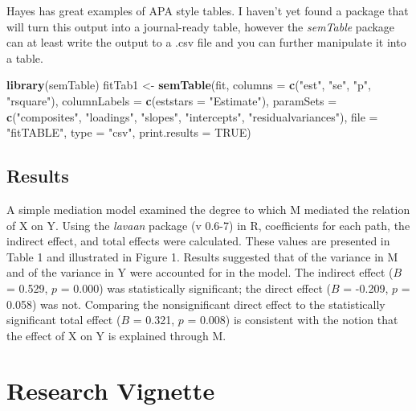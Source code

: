 \documentclass[
  11pt,
]{book}
\newenvironment{Shaded}{\begin{snugshade}}{\end{snugshade}}
\newcommand{\AttributeTok}[1]{\textcolor[rgb]{0.27,0.27,0.27}{#1}}
\newcommand{\ConstantTok}[1]{\textcolor[rgb]{0.37,0.37,0.37}{#1}}
\newcommand{\FunctionTok}[1]{\textcolor[rgb]{0.27,0.27,0.27}{\textbf{#1}}}
\newcommand{\NormalTok}[1]{#1}
\newcommand{\OtherTok}[1]{\textcolor[rgb]{0.37,0.37,0.37}{#1}}
\newcommand{\StringTok}[1]{\textcolor[rgb]{0.5,0.5,0.5}{#1}}
\begin{document}
Hayes has great examples of APA style tables. I haven't yet found a package that will turn this output into a journal-ready table, however the \emph{semTable} package can at least write the output to a .csv file and you can further manipulate it into a table.

\begin{Shaded}
\begin{Highlighting}[]
\FunctionTok{library}\NormalTok{(semTable)}
\NormalTok{fitTab1 }\OtherTok{\textless{}{-}} \FunctionTok{semTable}\NormalTok{(fit, }\AttributeTok{columns =} \FunctionTok{c}\NormalTok{(}\StringTok{"est"}\NormalTok{, }\StringTok{"se"}\NormalTok{, }\StringTok{"p"}\NormalTok{, }\StringTok{"rsquare"}\NormalTok{),  }\AttributeTok{columnLabels =} \FunctionTok{c}\NormalTok{(}\AttributeTok{eststars =} \StringTok{"Estimate"}\NormalTok{), }\AttributeTok{paramSets =} \FunctionTok{c}\NormalTok{(}\StringTok{"composites"}\NormalTok{, }\StringTok{"loadings"}\NormalTok{, }\StringTok{"slopes"}\NormalTok{, }\StringTok{"intercepts"}\NormalTok{, }\StringTok{"residualvariances"}\NormalTok{), }\AttributeTok{file =} \StringTok{"fitTABLE"}\NormalTok{, }\AttributeTok{type =} \StringTok{"csv"}\NormalTok{, }\AttributeTok{print.results =} \ConstantTok{TRUE}\NormalTok{)}
\end{Highlighting}
\end{Shaded}

\hypertarget{results-4}{%
\subsection{Results}\label{results-4}}

A simple mediation model examined the degree to which M mediated the relation of X on Y. Using the \emph{lavaan} package (v 0.6-7) in R, coefficients for each path, the indirect effect, and total effects were calculated. These values are presented in Table 1 and illustrated in Figure 1. Results suggested that of the variance in M and of the variance in Y were accounted for in the model. The indirect effect (\(B\) = 0.529, \(p\) = 0.000) was statistically significant; the direct effect (\(B\) = -0.209, \(p\) = 0.058) was not. Comparing the nonsignificant direct effect to the statistically significant total effect (\(B\) = 0.321, \(p\) = 0.008) is consistent with the notion that the effect of X on Y is explained through M.

\hypertarget{research-vignette-4}{%
\section{Research Vignette}\label{research-vignette-4}}
\end{document}
